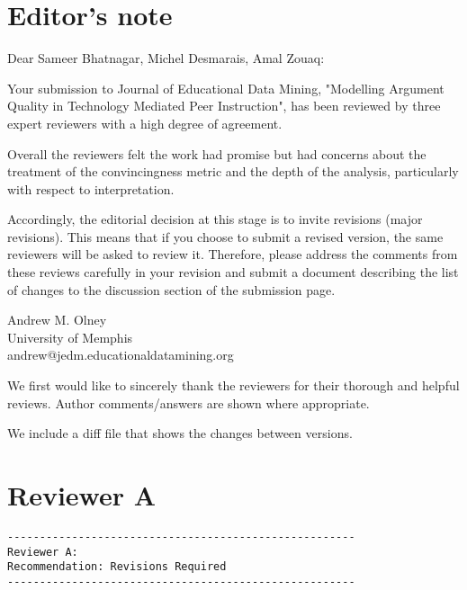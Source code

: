 \documentclass[notitlepage,12pt]{article}
\newcounter{answ}
\begin{document}

\section{Editor's note}

Dear Sameer Bhatnagar, Michel Desmarais, Amal Zouaq:

Your submission to Journal of Educational Data Mining, "Modelling Argument Quality in Technology Mediated Peer Instruction", has been reviewed by three expert reviewers with a high degree of agreement.

Overall the reviewers felt the work had promise but had concerns about the treatment of the convincingness metric and the depth of the analysis, particularly with respect to interpretation.

Accordingly, the editorial decision at this stage is to invite revisions (major revisions). This means that if you choose to submit a revised version, the same reviewers will be asked to review it. Therefore, please address the comments from these reviews carefully in your revision and submit a document describing the list of changes to the discussion section of the submission page.

Andrew M. Olney\\
University of Memphis\\
andrew@jedm.educationaldatamining.org

\begin{authors}
We first would like to sincerely thank the reviewers for their thorough and helpful reviews.  Author comments/answers are shown where appropriate.

We include a diff file that shows the changes between versions.
\end{authors}

\section{Reviewer A}

\begin{verbatim}
------------------------------------------------------
Reviewer A:
Recommendation: Revisions Required
------------------------------------------------------
\end{verbatim}
\end{document}
